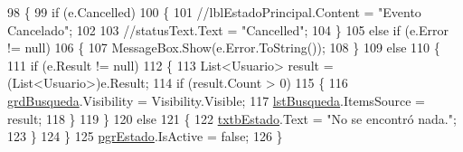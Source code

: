 \begin{DoxyCode}
98         \{
99             \textcolor{keywordflow}{if} (e.Cancelled)
100             \{
101                 \textcolor{comment}{//lblEstadoPrincipal.Content = "Evento Cancelado";}
102 
103                 \textcolor{comment}{//statusText.Text = "Cancelled";}
104             \}
105             \textcolor{keywordflow}{else} \textcolor{keywordflow}{if} (e.Error != null)
106             \{
107                 MessageBox.Show(e.Error.ToString());
108             \}
109             \textcolor{keywordflow}{else}
110             \{
111                 \textcolor{keywordflow}{if} (e.Result != null)
112                 \{
113                     List<Usuario> result = (List<Usuario>)e.Result;
114                     if (result.Count > 0)
115                     \{
116                         \hyperlink{class_proyecto___integrador__3_1_1_reportes_1_1_reporte_frecuencia_de_uso_af86d8cdcb91a2f6d6954bf44f4ad2b6c}{grdBusqueda}.Visibility = Visibility.Visible;
117                         \hyperlink{class_proyecto___integrador__3_1_1_reportes_1_1_reporte_frecuencia_de_uso_a94c9a9f5043efbb40679b90827da897e}{lstBusqueda}.ItemsSource = result;
118                     \}
119                 \}
120                 \textcolor{keywordflow}{else}
121                 \{
122                     \hyperlink{class_proyecto___integrador__3_1_1_reportes_1_1_reporte_frecuencia_de_uso_ab5dad4dbd48cba1238ec0914d940c499}{txtbEstado}.Text = \textcolor{stringliteral}{"No se encontró nada."};
123                 \}
124             \}
125             \hyperlink{class_proyecto___integrador__3_1_1_reportes_1_1_reporte_frecuencia_de_uso_a40046fa9e14c98adb20dbc8f99f83842}{pgrEstado}.IsActive = \textcolor{keyword}{false};
126         \}
\end{DoxyCode}
